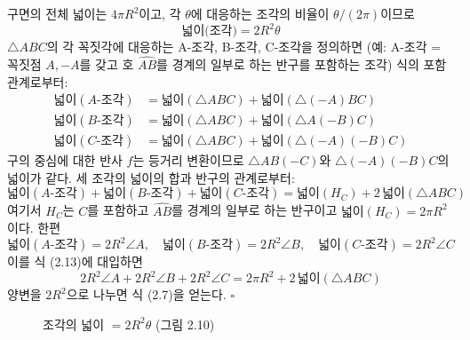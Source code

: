 \documentclass{article}
\begin{document}
구면의 전체 넓이는 $4\pi R^2$이고, 각 $\theta$에 대응하는 조각의 비율이 $\theta/(2\pi)$이므로
\[
  \text{넓이(조각)} = 2R^2\theta
\]
$\triangle ABC$의 각 꼭짓각에 대응하는 A-조각, B-조각, C-조각을 정의하면
(예: A-조각 = 꼭짓점 $A, -A$를 갖고 호 $\widehat{AB}$를 경계의 일부로 하는 반구를 포함하는 조각)
식의 포함관계로부터:
\begin{align*}
  \text{넓이}(A\text{-조각}) &= \text{넓이}(\triangle ABC) + \text{넓이}(\triangle(-A)BC) \tag{2.9}\\
  \text{넓이}(B\text{-조각}) &= \text{넓이}(\triangle ABC) + \text{넓이}(\triangle A(-B)C) \tag{2.10}\\
  \text{넓이}(C\text{-조각}) &= \text{넓이}(\triangle ABC) + \text{넓이}(\triangle(-A)(-B)C) \tag{2.12}
\end{align*}
구의 중심에 대한 반사 $f$는 등거리 변환이므로 $\triangle AB(-C)$와 $\triangle(-A)(-B)C$의 넓이가 같다.
세 조각의 넓이의 합과 반구의 관계로부터:
\[
  \text{넓이}(A\text{-조각}) + \text{넓이}(B\text{-조각}) + \text{넓이}(C\text{-조각})
  = \text{넓이}(H_C) + 2\,\text{넓이}(\triangle ABC) \tag{2.13}
\]
여기서 $H_C$는 $C$를 포함하고 $\widehat{AB}$를 경계의 일부로 하는 반구이고
$\text{넓이}(H_C) = 2\pi R^2$이다.
한편
\[
  \text{넓이}(A\text{-조각}) = 2R^2\angle A, \quad
  \text{넓이}(B\text{-조각}) = 2R^2\angle B, \quad
  \text{넓이}(C\text{-조각}) = 2R^2\angle C
\]
이를 식 (2.13)에 대입하면
\[
  2R^2\angle A + 2R^2\angle B + 2R^2\angle C = 2\pi R^2 + 2\,\text{넓이}(\triangle ABC)
\]
양변을 $2R^2$으로 나누면 식 (2.7)을 얻는다. \hfill $\square$

\begin{figure}[ht]
\centering
{}
\caption{조각의 넓이 $= 2R^2\theta$ (그림 2.10)}
\label{fig:2.10}
\end{figure}
\end{document}
